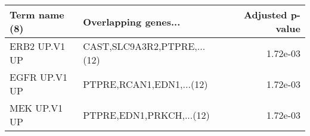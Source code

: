 \begin{tabular}{llr}
\toprule
Term name (8) &        Overlapping genes... &  Adjusted p-value \\
\midrule
ERB2 UP.V1 UP & CAST,SLC9A3R2,PTPRE,...(12) &          1.72e-03 \\
EGFR UP.V1 UP &    PTPRE,RCAN1,EDN1,...(12) &          1.72e-03 \\
 MEK UP.V1 UP &    PTPRE,EDN1,PRKCH,...(12) &          1.72e-03 \\
\bottomrule
\end{tabular}
